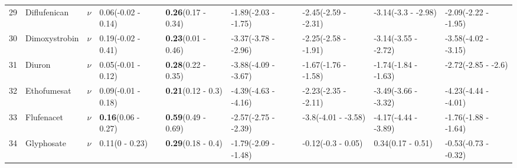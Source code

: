 \begin{longtable}{lp{2cm}p{0.6cm}p{1.8cm}p{1.8cm}p{1.8cm}p{1.8cm}p{1.8cm}p{1.8cm}}
  29 & Diflufenican & $\nu$ & 0.06\newline (-0.02 - 0.14) & \textbf{0.26}\newline (0.17 - 0.34) & -1.89\newline (-2.03 - -1.75) & -2.45\newline (-2.59 - -2.31) & -3.14\newline (-3.3 - -2.98) & -2.09\newline (-2.22 - -1.95) \\ 
  30 & Dimoxystrobin & $\nu$ & 0.19\newline (-0.02 - 0.41) & \textbf{0.23}\newline (0.01 - 0.46) & -3.37\newline (-3.78 - -2.96) & -2.25\newline (-2.58 - -1.91) & -3.14\newline (-3.55 - -2.72) & -3.58\newline (-4.02 - -3.15) \\ 
  31 & Diuron & $\nu$ & 0.05\newline (-0.01 - 0.12) & \textbf{0.28}\newline (0.22 - 0.35) & -3.88\newline (-4.09 - -3.67) & -1.67\newline (-1.76 - -1.58) & -1.74\newline (-1.84 - -1.63) & -2.72\newline (-2.85 - -2.6) \\ 
  32 & Ethofumesat & $\nu$ & 0.09\newline (-0.01 - 0.18) & \textbf{0.21}\newline (0.12 - 0.3) & -4.39\newline (-4.63 - -4.16) & -2.23\newline (-2.35 - -2.11) & -3.49\newline (-3.66 - -3.32) & -4.23\newline (-4.44 - -4.01) \\ 
  33 & Flufenacet & $\nu$ & \textbf{0.16}\newline (0.06 - 0.27) & \textbf{0.59}\newline (0.49 - 0.69) & -2.57\newline (-2.75 - -2.39) & -3.8\newline (-4.01 - -3.58) & -4.17\newline (-4.44 - -3.89) & -1.76\newline (-1.88 - -1.64) \\ 
  34 & Glyphosate & $\nu$ & 0.11\newline (0 - 0.23) & \textbf{0.29}\newline (0.18 - 0.4) & -1.79\newline (-2.09 - -1.48) & -0.12\newline (-0.3 - 0.05) & 0.34\newline (0.17 - 0.51) & -0.53\newline (-0.73 - -0.32) \\ 

\end{longtable}
